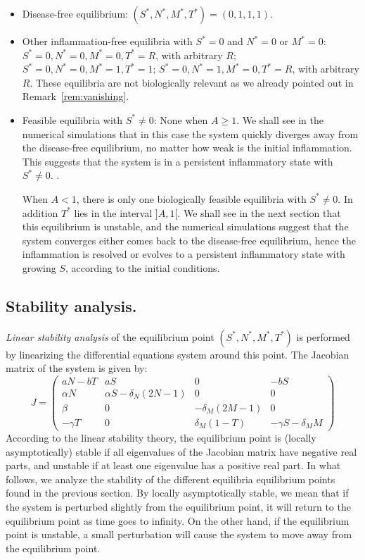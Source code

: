\documentclass[a4paper, 12pt]{article}
\providecommand{\DIFaddtex}[1]{{\protect\color{blue} \sf #1}} %
\providecommand{\DIFdeltex}[1]{{\protect\color{red} \scriptsize #1}} %
\providecommand{\DIFaddbegin}{} %
\providecommand{\DIFaddend}{} %
\providecommand{\DIFdelbegin}{} %
\providecommand{\DIFdelend}{} %
\providecommand{\DIFadd}[1]{\texorpdfstring{\DIFaddtex{#1}}{#1}} %
\providecommand{\DIFdel}[1]{\texorpdfstring{\DIFdeltex{#1}}{}} %
\begin{document}
\begin{itemize}
\item Disease-free equilibrium: $(S^*, N^*, M^*, T^*) = (0, 1, 1, 1)$.
\item Other \DIFaddbegin \DIFadd{inflammation-free }\DIFaddend equilibria with $S^* = 0$ \DIFaddbegin \DIFadd{and $N^* = 0$ or $M^* = 0$}\DIFaddend : 
$S^* = 0, N^* = 0, M^* = 0, T^* = R$, with arbitrary $R$;
 $S^* = 0, N^* = 0, M^* = 1, T^* = 1$;
 $S^* = 0, N^* = 1, M^* = 0, T^* = R$, with arbitrary $R$.
 \DIFaddbegin \DIFadd{These equilibria are not biologically relevant as we already pointed out in Remark~\ref{rem:vanishing}.
}\DIFaddend \item Feasible equilibria with $S^* \neq 0$: 
None when $A \geq 1$. We shall see in the numerical simulations that in this case the system quickly diverges away from the disease-free equilibrium, no matter how weak is the initial inflammation. 
This suggests that the system is in a persistent inflammatory state\DIFdelbegin \DIFdel{with $S^* \neq 0$.
}\DIFdelend \DIFaddbegin \DIFadd{.
}

\DIFaddend When $A < 1$, there is only one biologically feasible equilibria with $S^* \neq 0$. \DIFaddbegin \DIFadd{In addition $T^*$ lies in the interval $]A, 1[$.
 }\DIFaddend We shall see in the next section that this equilibrium is unstable,
  and the numerical simulations suggest that the system \DIFdelbegin \DIFdel{converges }\DIFdelend \DIFaddbegin \DIFadd{either comes back }\DIFaddend to the disease-free equilibrium, \DIFdelbegin \DIFdel{hence the inflammation is resolved}\DIFdelend \DIFaddbegin \DIFadd{or evolves to a persistent inflammatory state with growing $S$, according to the initial conditions}\DIFaddend .
\end{itemize} 
%     
\subsection{Stability analysis.}
\emph{Linear stability analysis} of the equilibrium point $ (S^*, N^*, M^*, T^*)$ is performed by linearizing the differential equations system around this point.
The Jacobian matrix of the system is given by:
\[
J = \begin{pmatrix}
aN - bT & aS & 0 & -bS \\
\alpha N & \alpha S - \delta_N (2N-1) & 0 & 0 \\
\beta & 0 & -\delta_M (2M-1) & 0 \\
-\gamma T & 0 & \delta_M (1-T) & -\gamma S - \delta_M M
\end{pmatrix}
\]
According to the linear stability theory, the equilibrium point is (locally asymptotically) stable if all eigenvalues of the Jacobian matrix have negative real parts, and unstable if at least one eigenvalue has a positive real part. In what follows,
 we analyze the stability of the different \DIFdelbegin \DIFdel{equilibria }\DIFdelend \DIFaddbegin \DIFadd{equilibrium }\DIFaddend points found in the previous section. By locally asymptotically stable, we mean that if the system is perturbed slightly from the equilibrium point, it will return to the equilibrium point as time goes to infinity. On the other hand, if the equilibrium point is unstable, a small perturbation will cause the system to move away from the equilibrium point.
\end{document}

